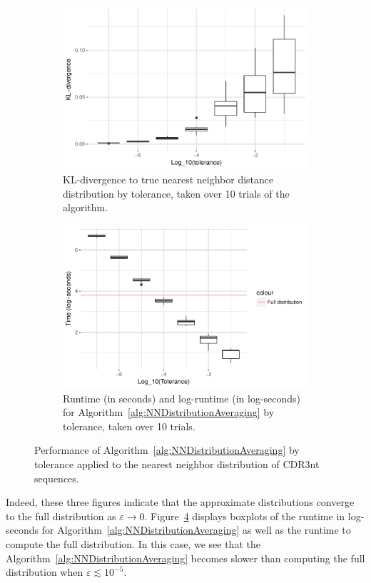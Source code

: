\documentclass{article}
\begin{document}
\begin{figure}
\begin{subfigure}{.49\textwidth}
    	\label{fig:NNECDF}
    \end{subfigure}
    \begin{subfigure}{.49\textwidth}
        \includegraphics[width=\linewidth]{Figures/NearestNeighbor/CDR3/div_by_tol.pdf}
    	\caption{KL-divergence to true nearest neighbor distance distribution by tolerance, taken over 10 trials of the algorithm.}
    	\label{fig:NNDivergences}
	\end{subfigure}
    \begin{subfigure}{.49\textwidth}
    	\includegraphics[width=0.9\linewidth]{Figures/NearestNeighbor/CDR3/log_time_by_tol.pdf}
    	\caption{Runtime (in seconds) and log-runtime (in log-seconds) for Algorithm~\ref{alg:NNDistributionAveraging} by tolerance, taken over 10 trials.}
    	\label{fig:NNTimes}
    \end{subfigure}
    \caption{Performance of Algorithm~\ref{alg:NNDistributionAveraging} by tolerance applied to the nearest neighbor distribution of CDR3nt sequences.}
\end{figure}
Indeed, these three figures indicate that the approximate distributions converge to the full distribution as $\varepsilon \to 0$.
Figure~\ref{fig:NNTimes} displays boxplots of the runtime in log-seconds for Algorithm~\ref{alg:NNDistributionAveraging} as well as the runtime to compute the full distribution.
In this case, we see that the Algorithm~\ref{alg:NNDistributionAveraging} becomes slower than computing the full distribution when $\varepsilon \lesssim 10^{-5}$.
\end{document}
